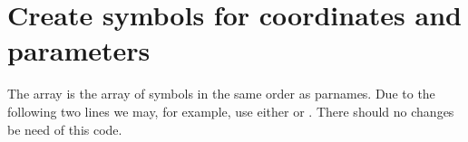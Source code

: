\documentclass[letterpaper,10pt,english]{jupyterBook}
\begin{document}
\section{Create symbols for coordinates and parameters}
\label{\detokenize{HomoclinicRGflowsGenSym:create-symbols-for-coordinates-and-parameters}}
\sphinxAtStartPar
The array  is the array of symbols in the same order as parnames.
Due to the following two lines we may, for example, use either  or
. There should no changes be need of this code.

\begin{sphinxVerbatim}[commandchars=\\\{\}]
\end{sphinxVerbatim}
\end{document}
